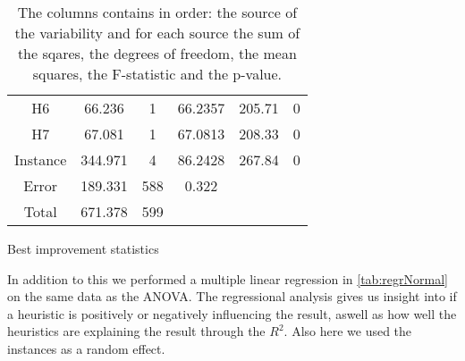 \documentclass[../main.tex]{subfiles}
\begin{document}
\begin{table}
\begin{adjustbox}{width=\columnwidth,center}
\begin{subtable}{.75\columnwidth}
\begin{tabular}{cccccc}
            H6      & 66.236    & 1 & 66.2357   & 205.71& 0     \\
            H7      & 67.081    & 1 & 67.0813   & 208.33& 0     \\
            Instance& 344.971   & 4 & 86.2428   & 267.84& 0     \\
            Error   & 189.331   &588& 0.322     &       &       \\
            Total   & 671.378   &599&           &       &       \\
            \hline
            \end{tabular}
        \caption{Best improvement statistics}
        \label{tab:anovaBestNormal}
        \end{subtable}
    \end{adjustbox}
    \label{tab:anovaNormal}
    \caption*{The columns contains in order: the source of the variability and for each source the sum of the sqares, the degrees of freedom, the mean squares, the F-statistic and the p-value.}
\end{table}

In addition to this we performed a multiple linear regression in \cref{tab:regrNormal} on the same data as the ANOVA.
The regressional analysis gives us insight into if a heuristic is positively or negatively influencing the result, aswell as how well the heuristics are explaining the result through the $R^2$.
Also here we used the instances as a random effect.
\end{document}
